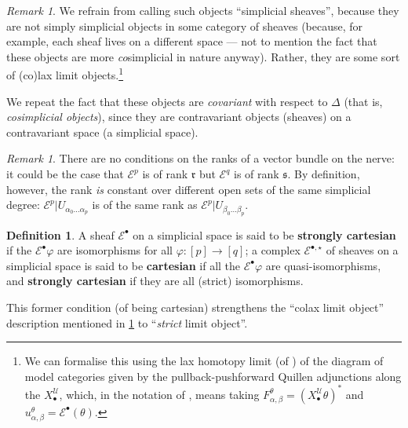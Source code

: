 \documentclass[11pt,fleqn]{article}
\theoremstyle{plain}
\theoremstyle{definition}
\newtheorem{definition}[theorem]{Definition}
\theoremstyle{remark}
\newtheorem{remark}[theorem]{Remark}
\numberwithin{equation}{theorem}
\newcommand{\cover}{\mathcal{U}}
\newcommand{\anotherbullet}{\star}
\newcommand{\restricted}{\mathbin{\big\vert}}
\newcommand{\define}[1]{\textbf{#1}}
\newcommand{\nerve}[1]{X_{#1}^\cover}
\begin{document}
        \begin{remark}\label{remark:simplicial-sheaves-terminology}
            We refrain from calling such objects ``simplicial sheaves'', because they are not simply simplicial objects in some category of sheaves (because, for example, each sheaf lives on a different space --- not to mention the fact that these objects are more \emph{co}simplicial in nature anyway).
            Rather, they are some sort of (co)lax limit objects.\footnote{We can formalise this using the lax homotopy limit (of \cite[Definition~3.1]{Bergner2012}) of the diagram of model categories given by the pullback-pushforward Quillen adjunctions along the $\nerve{\bullet}$, which, in the notation of \cite{Bergner2012}, means taking $F_{\alpha,\beta}^\theta = (\nerve{\bullet}\theta)^*$ and $u_{\alpha,\beta}^\theta = \mathcal{E}^\bullet(\theta)$.}

            We repeat the fact that these objects are \emph{covariant} with respect to $\Delta$ (that is, \emph{cosimplicial objects}), since they are contravariant objects (sheaves) on a contravariant space (a simplicial space).
        \end{remark}

        \begin{remark}\label{remark:rank-of-vector-bundle-on-the-nerve}
            There are no conditions on the ranks of a vector bundle on the nerve: it could be the case that $\mathcal{E}^p$ is of rank $\mathfrak{r}$ but $\mathcal{E}^q$ is of rank $\mathfrak{s}$.
            By definition, however, the rank \emph{is} constant over different open sets of the same simplicial degree: $\mathcal{E}^p\restricted U_{\alpha_0\ldots\alpha_p}$ is of the same rank as $\mathcal{E}^p\restricted U_{\beta_0\ldots\beta_p}$.
        \end{remark}

        \begin{definition}
            A sheaf $\mathcal{E}^\bullet$ on a simplicial space is said to be \define{strongly cartesian} if the $\mathcal{E}^\bullet\varphi$ are isomorphisms for all $\varphi\colon[p]\to[q]$; a complex $\mathcal{E}^{\bullet,\anotherbullet}$ of sheaves on a simplicial space is said to be \define{cartesian} if all the $\mathcal{E}^\bullet\varphi$ are quasi-isomorphisms, and \define{strongly cartesian} if they are all (strict) isomorphisms.

            This former condition (of being cartesian) strengthens the ``colax limit object'' description mentioned in \cref{remark:simplicial-sheaves-terminology} to ``\emph{strict} limit object''.
        \end{definition}
\end{document}

